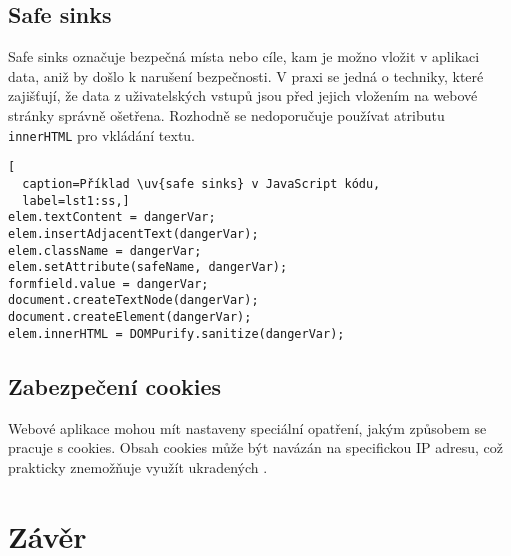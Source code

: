 \documentclass[11pt, conference, a4paper]{IEEEtran}
\begin{document}
\subsection{Safe sinks}
Safe sinks označuje bezpečná místa nebo cíle, kam je možno vložit v aplikaci data, aniž by došlo k narušení bezpečnosti. V praxi se jedná o techniky, které zajišťují, že data z uživatelských vstupů jsou před jejich vložením na webové stránky správně ošetřena. Rozhodně se nedoporučuje používat atributu \texttt{innerHTML} pro vkládání textu.~\cite{Prevention-XSS-owasp}

\begin{lstlisting}[
  caption=Příklad \uv{safe sinks} v JavaScript kódu,
  label=lst1:ss,]
elem.textContent = dangerVar;
elem.insertAdjacentText(dangerVar);
elem.className = dangerVar;
elem.setAttribute(safeName, dangerVar);
formfield.value = dangerVar;
document.createTextNode(dangerVar);
document.createElement(dangerVar);
elem.innerHTML = DOMPurify.sanitize(dangerVar);
\end{lstlisting}


\subsection{Zabezpečení cookies}
Webové aplikace mohou mít nastaveny speciální opatření, jakým způsobem se pracuje s cookies. Obsah cookies může být navázán na specifickou IP adresu, což prakticky znemožňuje využít ukradených .


\section{Závěr}


\newpage
  
  
\end{document}
